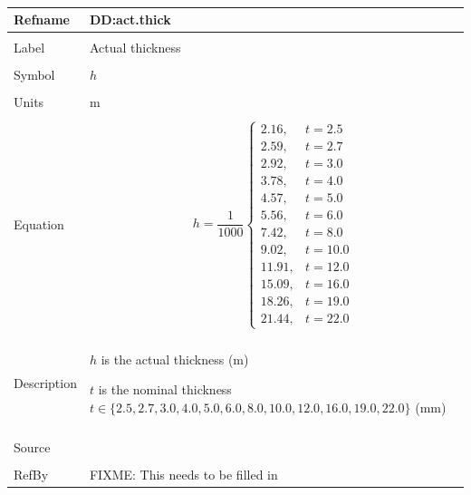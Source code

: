 \documentclass[12pt]{article}
\begin{document}
~\newline
\noindent \begin{minipage}{\textwidth}
\begin{tabular}{p{} p{}}
\toprule \textbf{Refname} & \textbf{DD:act.thick}
\label{DD:act.thick}
\\ \midrule \\
Label & Actual thickness
\\ \midrule \\
Symbol & $h$
\\ \midrule \\
Units & m
\\ \midrule \\
Equation & \begin{dmath}
           h=\frac{1}{1000} \begin{cases}
2.16, & t=2.5\\
2.59, & t=2.7\\
2.92, & t=3.0\\
3.78, & t=4.0\\
4.57, & t=5.0\\
5.56, & t=6.0\\
7.42, & t=8.0\\
9.02, & t=10.0\\
11.91, & t=12.0\\
15.09, & t=16.0\\
18.26, & t=19.0\\
21.44, & t=22.0
\end{cases}
           \end{dmath}
\\ \midrule \\
Description & \begin{symbDescription}
              \item{$h$ is the actual thickness (m)}
              \item{$t$ is the nominal thickness $t\in{}\{2.5,2.7,3.0,4.0,5.0,6.0,8.0,10.0,12.0,16.0,19.0,22.0\}$ (mm)}
              \end{symbDescription}
\\ \midrule \\
Source & 
\\ \midrule \\
RefBy & FIXME: This needs to be filled in
\\ \bottomrule \end{tabular}
\end{minipage}\\
~\newline
\end{document}
